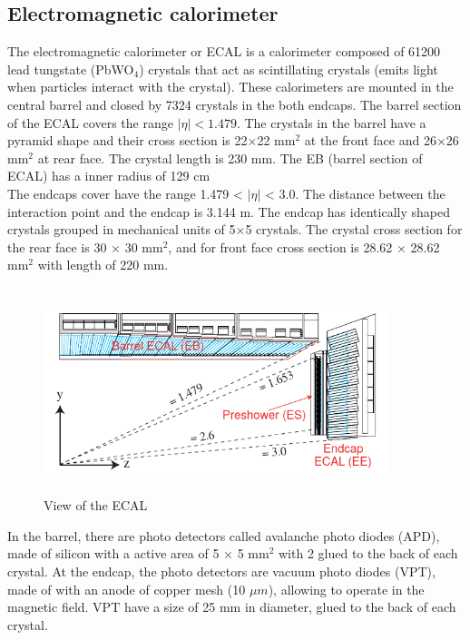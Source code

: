 \subsection{Electromagnetic calorimeter}

The electromagnetic calorimeter or ECAL is a calorimeter composed of 61200 lead tungstate (PbWO$_4$) crystals that act as scintillating crystals (emits light when particles interact with the crystal). These calorimeters are mounted in the central barrel and closed by 7324 crystals in the both endcaps. The barrel section of the ECAL covers the range $|\eta| < 1.479$. The crystals in the barrel have a pyramid shape and their cross section is 22$\times$22 mm$^2$ at the front face and 26$\times$26 mm$^2$ at rear face. The crystal length is 230 mm. The EB (barrel section of ECAL) has a inner radius of 129 cm\cite{cms-manual}\\

The endcaps cover have the range 1.479 < $|\eta|$ < 3.0. The distance between the interaction point and the endcap is 3.144 m. The endcap has identically shaped crystals grouped in
mechanical units of 5×5 crystals. The crystal cross section for the rear face is 30 $\times$ 30 mm$^2$, and for front face cross section is 28.62 $\times$ 28.62 mm$^2$ with length of 220 mm.
\\
\begin{figure}[!htbp]
	\centering
	\includegraphics[width=10cm,height=6cm]{Chapter2/ecal.png}
	\caption[View of the ECAL]{View of the ECAL\cite{cms-manual}}\label{ecal}
\end{figure}
In the barrel, there are photo detectors called avalanche photo diodes (APD), made of silicon with a active area of 5 $\times$ 5 mm$^2$ with 2 glued to the back of each crystal. At the endcap, the photo detectors are vacuum photo diodes (VPT), made of with an anode of copper mesh (10 $\mu m$), allowing to operate in the magnetic field. VPT have a size of 25 mm in diameter, glued to the back of each crystal.\\


